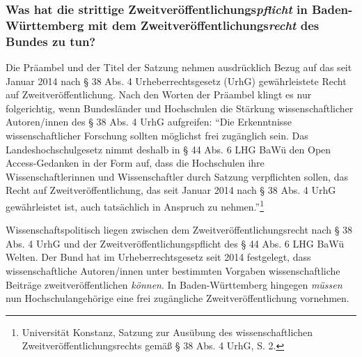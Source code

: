 \documentclass[a4paper,
fontsize=11pt,
oneside,
numbers=noperiodatend,
parskip=half-,
bibliography=totoc,
final
]{scrartcl}
\begin{document}
\hypertarget{was-hat-die-strittige-zweitveruxf6ffentlichungspflicht-in-baden-wuxfcrttemberg-mit-dem-zweitveruxf6ffentlichungsrecht-des-bundes-zu-tun}{%
\subsubsection{\texorpdfstring{Was hat die strittige
Zweitveröffentlichungs\emph{pflicht} in Baden-Württemberg mit dem
Zweitveröffentlichungs\emph{recht} des Bundes zu
tun?}{Was hat die strittige Zweit\-ver\-öffent\-lich\-ungs\-pflicht in Baden-Württemberg mit dem Zweit\-ver\-öffent\-lich\-ungs\-recht des Bundes zu tun?}}\label{was-hat-die-strittige-zweitveruxf6ffentlichungspflicht-in-baden-wuxfcrttemberg-mit-dem-zweitveruxf6ffentlichungsrecht-des-bundes-zu-tun}}

Die Präambel und der Titel der Satzung nehmen ausdrücklich Bezug auf das
seit Januar 2014 nach § 38 Abs. 4 Urheberrechtsgesetz (UrhG)
gewährleistete Recht auf Zweitveröffentlichung. Nach den Worten der
Präambel klingt es nur folgerichtig, wenn Bundesländer und Hochschulen
die Stärkung wissenschaftlicher Autoren/innen des § 38 Abs. 4 UrhG
aufgreifen: \enquote{Die Erkenntnisse wissenschaftlicher Forschung
sollten möglichst frei zugänglich sein. Das Landeshochschulgesetz nimmt
deshalb in § 44 Abs. 6 LHG BaWü den Open Access-Gedanken in der Form
auf, dass die Hochschulen ihre Wissenschaftlerinnen und Wissenschaftler
durch Satzung verpflichten sollen, das Recht auf Zweitveröffentlichung,
das seit Januar 2014 nach § 38 Abs. 4 UrhG gewährleistet ist, auch
tatsächlich in Anspruch zu nehmen.}\footnote{Universität Konstanz,
  Satzung zur Ausübung des wissenschaftlichen
  Zweit\-ver\-öffent\-lich\-ungs\-rechts gemäß § 38 Abs. 4 UrhG, S. 2.}

Wissenschaftspolitisch liegen zwischen dem Zweit\-ver\-öffent\-lich\-ungs\-recht
nach § 38 Abs. 4 UrhG und der Zweit\-ver\-öffent\-lich\-ungs\-pflicht des § 44
Abs. 6 LHG BaWü Welten. Der Bund hat im Urheberrechtsgesetz seit 2014
festgelegt, dass wissenschaftliche Autoren/innen unter bestimmten
Vorgaben wissenschaftliche Beiträge zweitveröffentlichen \emph{können}.
In Baden-Württemberg hingegen \emph{müssen} nun Hochschulangehörige eine
frei zugängliche Zweitveröffentlichung vornehmen.
\end{document}
